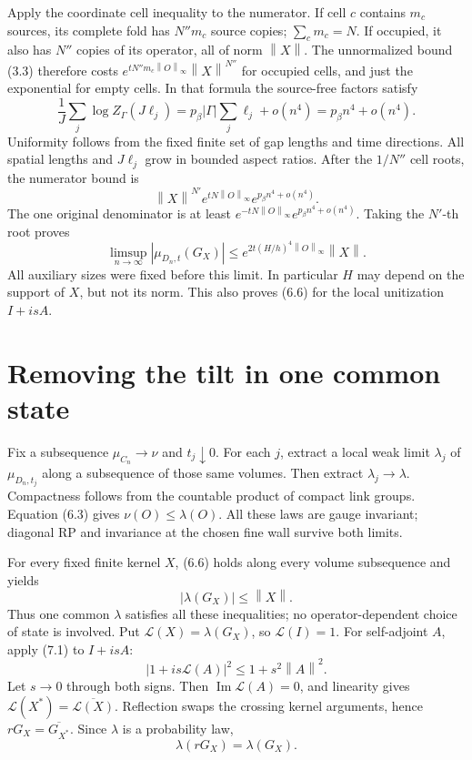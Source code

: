 \documentclass[11pt]{article}
\theoremstyle{remark}
\newcommand{\norm}[1]{\left\|#1\right\|}
\begin{document}
Apply the coordinate cell inequality to the numerator. If cell $c$
contains $m_c$ sources, its complete fold has $N''m_c$ source copies;
$\sum_cm_c=N$. If occupied, it also has $N''$ copies of its
operator, all of norm $\norm X$. The unnormalized bound (3.3)
therefore costs $e^{tN''m_c\norm O_\infty}\norm X^{N''}$
for occupied cells, and just the exponential for empty cells.
In that formula the source-free factors satisfy
\[
 \frac1J\sum_j\log Z_\Gamma(J\ell_j)
   =p_\beta|\Gamma|\sum_j\ell_j+o(n^4)
   =p_\beta n^4+o(n^4).
 \tag{6.5}
\]
Uniformity follows from the fixed finite set of gap lengths and
time directions. All spatial lengths and $J\ell_j$ grow in bounded
aspect ratios. After the $1/N''$ cell roots, the numerator bound is
\[
 \norm X^{N'}e^{tN\norm O_\infty}
       e^{p_\beta n^4+o(n^4)}.
\]
The one original denominator is at least
$e^{-tN\norm O_\infty}e^{p_\beta n^4+o(n^4)}$.
Taking the $N'$-th root proves
\[
 \limsup_{n\to\infty}|\mu_{D_n,t}(G_X)|
 \le e^{2t(H/h)^4\norm O_\infty}\norm X.
 \tag{6.6}
\]
All auxiliary sizes were fixed before this limit. In particular
$H$ may depend on the support of $X$, but not its norm. This
also proves (6.6) for the local unitization $I+isA$.

\section{Removing the tilt in one common state}

Fix a subsequence $\mu_{C_n}\to\nu$ and $t_j\downarrow0$.
For each $j$, extract a local weak limit $\lambda_j$ of
$\mu_{D_n,t_j}$ along a subsequence of those same volumes.
Then extract $\lambda_j\to\lambda$. Compactness follows from
the countable product of compact link groups. Equation (6.3)
gives $\nu(O)\le\lambda(O)$. All these laws are gauge invariant;
diagonal RP and invariance at the chosen fine wall survive both limits.

For every fixed finite kernel $X$, (6.6) holds along every volume
subsequence and yields
\[
 |\lambda(G_X)|\le\norm X.
 \tag{7.1}
\]
Thus one common $\lambda$ satisfies all these inequalities; no
operator-dependent choice of state is involved. Put
$\mathcal L(X)=\lambda(G_X)$, so $\mathcal L(I)=1$.
For self-adjoint $A$, apply (7.1) to $I+isA$:
\[
 |1+is\mathcal L(A)|^2\le1+s^2\norm A^2.
\]
Let $s\to0$ through both signs. Then
$\operatorname{Im}\mathcal L(A)=0$, and linearity gives
$\mathcal L(X^*)=\overline{\mathcal L(X)}$.
Reflection swaps the crossing kernel arguments, hence
$rG_X=\overline{G_{X^*}}$. Since $\lambda$ is a probability law,
\[
 \lambda(rG_X)=\lambda(G_X).
 \tag{7.2}
\]
\end{document}
